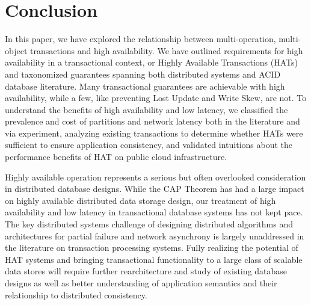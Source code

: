 
\section{Conclusion}

In this paper, we have explored the relationship between
multi-operation, multi-object transactions and high availability. We
have outlined requirements for high availability in a transactional
context, or Highly Available Transactions (HATs) and taxonomized
guarantees spanning both distributed systems and ACID database
literature. Many transactional guarantees are achievable with high
availability, while a few, like preventing Lost Update and Write Skew,
are not. To understand the benefits of high availability and low
latency, we classified the prevalence and cost of partitions and
network latency both in the literature and via experiment, analyzing
existing transactions to determine whether HATs were sufficient to
ensure application consistency, and validated intuitions about the
performance benefits of HAT on public cloud infrastructure.

Highly available operation represents a serious but often overlooked
consideration in distributed database designs. While the CAP Theorem
has had a large impact on highly available distributed data storage
design, our treatment of high availability and low latency in
transactional database systems has not kept pace. The key distributed
systems challenge of designing distributed algorithms and
architectures for partial failure and network asynchrony is largely
unaddressed in the literature on transaction processing systems. Fully
realizing the potential of HAT systems and bringing transactional
functionality to a large class of scalable data stores will require
further rearchitecture and study of existing database designs as well
as better understanding of application semantics and their
relationship to distributed consistency.
